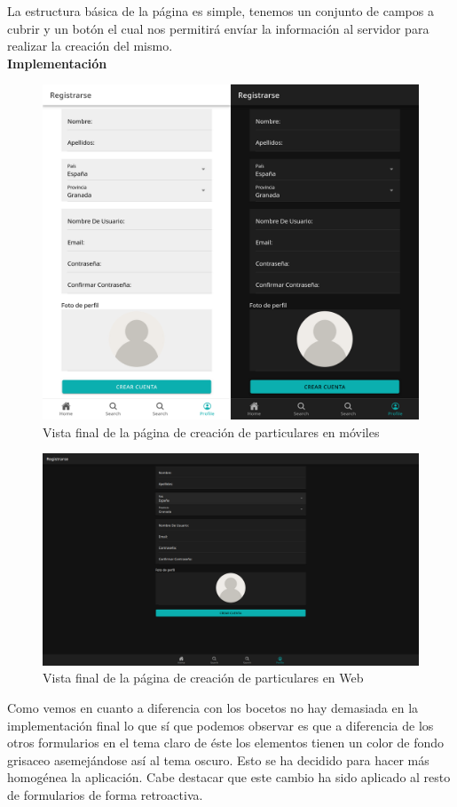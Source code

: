 La estructura básica de la página es simple, tenemos un conjunto de campos a cubrir y un botón el cual nos permitirá envíar la información al servidor para realizar la creación del mismo. \\

\textbf{Implementación}

\begin{figure}[H]
	\centering
	\includegraphics[width=0.7\linewidth]{"sprint 2/hu5/impRegistroParticulares"}
	\caption{Vista final de la página de creación de particulares en móviles}
	\label{fig:impregistroparticulares}
\end{figure}

\begin{figure}[H]
	\centering
	\includegraphics[width=0.7\linewidth]{"sprint 2/hu5/impRegistroParticularesWeb"}
	\caption{Vista final de la página de creación de particulares en Web}
	\label{fig:impregistroparticularesweb}
\end{figure}


Como vemos en cuanto a diferencia con los bocetos no hay demasiada en la implementación final lo que sí que podemos observar es que a diferencia de los otros formularios en el tema claro de éste los elementos tienen un color de fondo grisaceo asemejándose así al tema oscuro. Esto se ha decidido para hacer más homogénea la aplicación. Cabe destacar que este cambio ha sido aplicado al resto de formularios de forma retroactiva.

